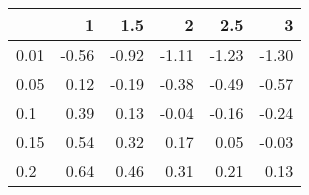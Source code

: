 
\begin{tabular}{lrrrrr}
\toprule
  & 1 & 1.5 & 2 & 2.5 & 3\\
\midrule
0.01 & -0.56 & -0.92 & -1.11 & -1.23 & -1.30\\
0.05 & 0.12 & -0.19 & -0.38 & -0.49 & -0.57\\
0.1 & 0.39 & 0.13 & -0.04 & -0.16 & -0.24\\
0.15 & 0.54 & 0.32 & 0.17 & 0.05 & -0.03\\
0.2 & 0.64 & 0.46 & 0.31 & 0.21 & 0.13\\
\bottomrule
\end{tabular}
